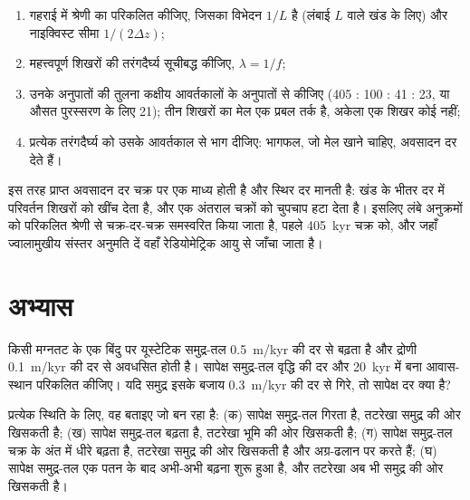 \begin{method}[चक्र-मोटाई से अवसादन दर]\label{met:b3:sequence-stratigraphy:cycles}
\begin{enumerate}
\item गहराई में श्रेणी का  परिकलित कीजिए, जिसका विभेदन
  $1/L$ है (लंबाई $L$ वाले खंड के लिए) और नाइक्विस्ट सीमा $1/(2\Delta z)$;
\item महत्त्वपूर्ण शिखरों की तरंगदैर्घ्य सूचीबद्ध कीजिए, $\lambda = 1/f$;
\item उनके अनुपातों की तुलना कक्षीय आवर्तकालों के अनुपातों से कीजिए (405 : 100 : 41
  : 23, या औसत पुरस्सरण के लिए 21); तीन शिखरों का मेल एक प्रबल
  तर्क है, अकेला एक शिखर कोई नहीं;
\item प्रत्येक तरंगदैर्घ्य को उसके आवर्तकाल से भाग दीजिए: भागफल, जो
  मेल खाने चाहिए, अवसादन दर देते हैं।
\end{enumerate}
\end{method}

इस तरह प्राप्त अवसादन दर चक्र पर एक माध्य होती है
और स्थिर दर मानती है: खंड के भीतर दर में परिवर्तन शिखरों को खींच देता है,
और एक अंतराल चक्रों को चुपचाप हटा देता है। इसलिए लंबे अनुक्रमों को
परिकलित श्रेणी से चक्र-दर-चक्र समस्वरित किया जाता है,
पहले \qty{405}{kyr} चक्र को, और जहाँ ज्वालामुखीय संस्तर अनुमति दें वहाँ रेडियोमेट्रिक आयु से जाँचा जाता है।

\section{अभ्यास}

\begin{exercise}[$\star$]\label{exo:b3:sequence-stratigraphy:1}
किसी मग्नतट के एक बिंदु पर यूस्टेटिक समुद्र-तल \qty{0.5}{m/kyr} की दर से बढ़ता है और
द्रोणी \qty{0.1}{m/kyr} की दर से अवधसित होती है। सापेक्ष समुद्र-तल वृद्धि की दर
और \qty{20}{kyr} में बना आवास-स्थान परिकलित कीजिए। यदि समुद्र इसके बजाय
\qty{0.3}{m/kyr} की दर से गिरे, तो सापेक्ष दर क्या है?
\end{exercise}

\begin{exercise}[$\star$]\label{exo:b3:sequence-stratigraphy:2}
प्रत्येक स्थिति के लिए, वह  बताइए जो बन रहा है: (क) सापेक्ष समुद्र-तल
गिरता है, तटरेखा समुद्र की ओर खिसकती है; (ख) सापेक्ष समुद्र-तल बढ़ता है,
तटरेखा भूमि की ओर खिसकती है; (ग) सापेक्ष समुद्र-तल चक्र के अंत में धीरे बढ़ता है,
तटरेखा समुद्र की ओर खिसकती है और अग्र-ढलान  पर  करते हैं;
(घ) सापेक्ष समुद्र-तल एक पतन के बाद अभी-अभी बढ़ना शुरू हुआ है,
और तटरेखा अब भी समुद्र की ओर खिसकती है।
\end{exercise}

